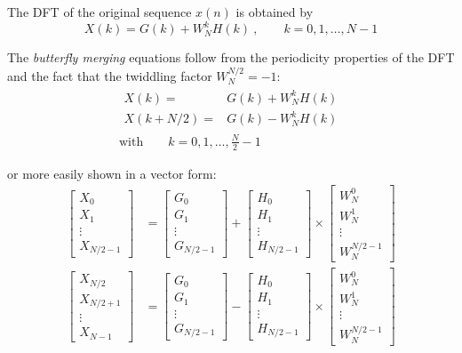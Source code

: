The DFT of the original sequence $x(n)$ is obtained by
\begin{equation*}
	X(k) = G(k) + W_N^k H(k) \:,\qquad k=0,1,\ldots,N-1
\end{equation*}

The \emph{butterfly merging} equations follow from the periodicity properties
of the DFT and the fact that the twiddling factor $W_N^{N/2} = -1$:
\begin{align*}
	\begin{array}{rl}
		X(k) = & G(k) + W_N^k H(k) \\
		X(k+N/2) = & G(k) - W_N^k H(k)
	\end{array} \\
	\text{with}\qquad k=0,1,\ldots,\frac{N}{2}-1
\end{align*}

or more easily shown in a vector form:
\begin{align*}
	\begin{bmatrix}	X_0 \\ X_1 \\ \vdots \\ X_{N/2-1} \end{bmatrix} &=
	\begin{bmatrix}	G_0 \\ G_1 \\ \vdots \\ G_{N/2-1} \end{bmatrix} +
	\begin{bmatrix}	H_0 \\ H_1 \\ \vdots \\ H_{N/2-1} \end{bmatrix} \times
	\begin{bmatrix}	W^0_N \\ W^1_N \\ \vdots \\ W^{N/2-1}_N \end{bmatrix}
	\\
	\begin{bmatrix}	X_{N/2} \\ X_{N/2+1} \\ \vdots \\ X_{N-1} \end{bmatrix} &=
	\begin{bmatrix}	G_0 \\ G_1 \\ \vdots \\ G_{N/2-1} \end{bmatrix} -
	\begin{bmatrix}	H_0 \\ H_1 \\ \vdots \\ H_{N/2-1} \end{bmatrix} \times
	\begin{bmatrix}	W^0_N \\ W^1_N \\ \vdots \\ W^{N/2-1}_N \end{bmatrix}
\end{align*}

